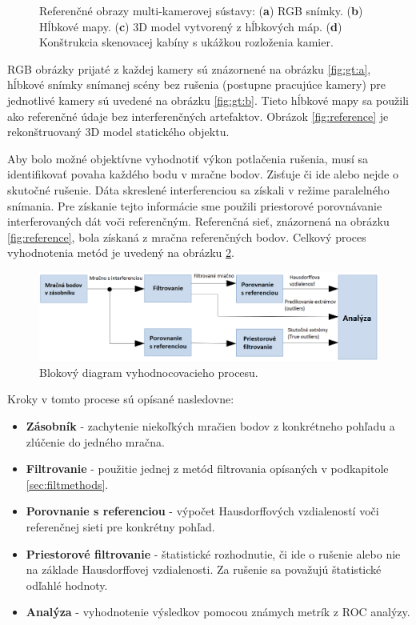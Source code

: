\begin{figure}[H]
	\caption{Referenčné obrazy multi-kamerovej sústavy: (\textbf{a}) RGB snímky. (\textbf{b}) Hĺbkové mapy. (\textbf{c}) 3D model vytvorený z hĺbkových máp. (\textbf{d}) Konštrukcia skenovacej kabíny s ukážkou rozloženia kamier.}
	\label{fig:gt}
\end{figure}

RGB obrázky prijaté z každej kamery sú znázornené na obrázku \ref {fig:gt:a}, hĺbkové snímky snímanej scény bez rušenia (postupne pracujúce kamery) pre jednotlivé kamery sú uvedené na obrázku \ref {fig:gt:b}. Tieto hĺbkové mapy sa použili ako referenčné údaje bez interferenčných artefaktov. Obrázok \ref{fig:reference} je rekonštruovaný 3D model statického objektu.

Aby bolo možné objektívne vyhodnotiť výkon potlačenia rušenia, musí sa identifikovať povaha každého bodu v mračne bodov. Zisťuje či ide alebo nejde o skutočné rušenie. Dáta skreslené interferenciou sa získali v režime paralelného snímania. Pre získanie tejto informácie sme použili priestorové porovnávanie interferovaných dát voči referenčným. Referenčná sieť, znázornená na obrázku \ref {fig:reference}, bola získaná z mračna referenčných bodov. Celkový proces vyhodnotenia metód je uvedený na obrázku \ref{fig:eval}.

\begin{figure}[H]
	\centering
	\includegraphics[width=\textwidth]{figures/eval.png}
	\caption{Blokový diagram vyhodnocovacieho procesu.}
	\label{fig:eval}
\end{figure}

\noindent Kroky v tomto procese sú opísané nasledovne:

\begin{itemize}
	\item \textbf{Zásobník} - zachytenie niekoľkých mračien bodov z konkrétneho pohľadu a zlúčenie do jedného mračna.
	\item \textbf{Filtrovanie} - použitie jednej z metód filtrovania opísaných v podkapitole \ref{sec:filtmethods}.
	\item \textbf{Porovnanie s referenciou} - výpočet Hausdorffových vzdialeností voči referenčnej sieti pre konkrétny pohľad.
	\item \textbf{Priestorové filtrovanie} - štatistické rozhodnutie, či ide o rušenie alebo nie na základe Hausdorffovej vzdialenosti. Za rušenie sa považujú štatistické odľahlé hodnoty.
	\item \textbf{Analýza} - vyhodnotenie výsledkov pomocou známych metrík z ROC analýzy.
\end{itemize}

